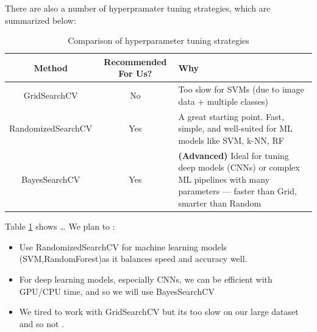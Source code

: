 \documentclass{article}
\begin{document}
There are also a number of hyperpramater tuning strategies, which are summarized below:
\begin{table}[h]
    \centering
    \renewcommand{\arraystretch}{1.3}
    \begin{tabular}{|c|c|p{8cm}|}
        \hline
        \textbf{Method} & \textbf{Recommended For Us?} & \textbf{Why} \\ \hline
        GridSearchCV & No & Too slow for SVMs (due to image data + multiple classes) \\ \hline
        RandomizedSearchCV & Yes & A great starting point. Fast, simple, and well-suited for ML models like SVM, k-NN, RF \\ \hline
        BayesSearchCV & Yes & \textbf{(Advanced)} Ideal for tuning deep models (CNNs) or complex ML pipelines with many parameters — faster than Grid, smarter than Random \\ \hline
    \end{tabular}
    \caption{Comparison of hyperparameter tuning strategies}
    \label{tab:tuning_methods}
\end{table}

Table \ref{tab:tuning_methods} shows \dots
We plan to :
\begin{itemize}
    \item Use RandomizedSearchCV for machine learning models (SVM,RandomForest)as it balances speed and accuracy well.
    \item For deep learning models, especially CNNs, we can be efficient with GPU/CPU time, and so we will use BayesSearchCV
    \item We tired to work with GridSearchCV but its too slow on our large dataset and so not .

\end{itemize}
\end{document}
